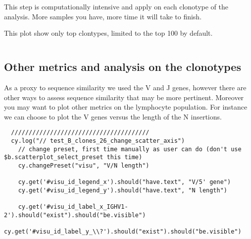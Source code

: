 

\begin{verbatim}
\end{verbatim}

This step is computationally intensive and apply on each clonotype of the analysis.
More samples you have, more time it will take to finish.


This plot show only top clontypes, limited to the top 100 by default.



\begin{verbatim}
\end{verbatim}



\subsection{Other metrics and analysis on the clonotypes}

As a proxy to sequence similarity we used the V and J genes, however there are
other ways to assess sequence similarity that may be more pertinent.
Moreover you may want to plot other metrics on the lymphocyte population.
%
For instance we can choose to plot the V genes versus the length of the N
insertions.
\begin{verbatim}
  ///////////////////////////////////////
  cy.log("// test_B_clones_26_change_scatter_axis")
    // change preset, first time manually as user can do (don't use $b.scatterplot_select_preset this time)
    cy.changePreset("visu", "V/N length")

    cy.get('#visu_id_legend_x').should("have.text", "V/5' gene")
    cy.get('#visu_id_legend_y').should("have.text", "N length")

    cy.get('#visu_id_label_x_IGHV1-2').should("exist").should("be.visible")
    cy.get('#visu_id_label_y_\\?').should("exist").should("be.visible")


\end{verbatim}

